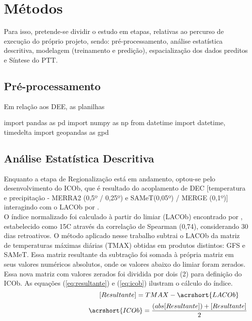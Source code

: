 \section{Métodos}

\indent Para isso, pretende-se dividir o estudo em etapas, relativas ao percurso de execução do próprio projeto, sendo: pré-processamento, análise estatística descritiva, modelagem (treinamento e predição), espacialização dos dados preditos e Síntese do \acrfull{PTT}.\\


\subsection{Pré-processamento}

Em relação aos \acrshort{DEE}, as planilhas 

import pandas as pd
import numpy as np
from datetime import datetime, timedelta
import geopandas as gpd


\subsection{Análise Estatística Descritiva}

\indent Enquanto a etapa de Regionalização está em andamento, optou-se pelo desenvolvimento do \acrfull{ICOb}, que é resultado do acoplamento de \acrshort{DEC} [temperatura e precipitação - MERRA2 (0,5º / 0,25º) e SAMeT(0,05º) / MERGE (0,1º)]  interagindo com o \acrfull{LACOb} por .\\
\indent O índice normalizado foi calculado à partir do limiar (\acrshort{LACOb}) encontrado por , estabelecido como 15C através da correlação de Spearman (0,74), considerando 30 dias retroativos. O método aplicado nesse trabalho subtrai o \acrshort{LACOb} da matriz de temperaturas máximas diárias (TMAX) obtidas em produtos distintos: \acrshort{GFS} e \acrshort{SAMeT}. Essa matriz resultante da subtração foi somada à própria matriz em seus valores numéricos absolutos, onde os valores abaixo do limiar foram zerados. Essa nova matriz com valores zerados foi dividida por dois (2) para definição do \acrfull{ICOb}. As equações (\ref{eq:resultante}) e (\ref{eq:icob}) ilustram o cálculo do índice.
\begin{equation}
\hspace{4,5cm} [Resultante] = TMAX - \acrshort{LACOb}
    \label{eq:resultante}
\end{equation}
\begin{equation}
\hspace{4.5cm} \acrshort{ICOb} = \frac{(abs[Resultante])+[Resultante]}{2}
    \label{eq:icob}
\end{equation}


